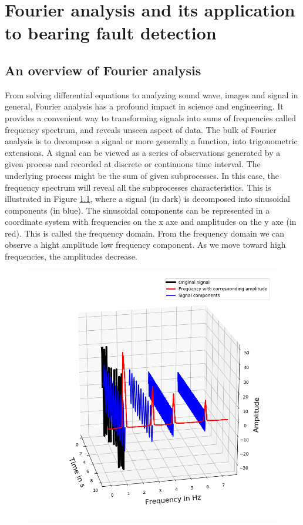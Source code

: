 \documentclass[../Main/thesis.tex]{subfiles}
\begin{document}
\chapter[Fourier analysis and its application to bearing fault detection]{Fourier analysis and its application to bearing fault detection}
\label{sec:chapter2}

\section{An overview of Fourier analysis}
From solving differential equations to analyzing sound wave, images and signal in general, Fourier analysis has a profound impact in science and engineering. It provides a convenient way to transforming signals into sums of frequencies called frequency spectrum, and reveals unseen aspect of data. The bulk of Fourier analysis is to decompose a signal or more generally a function, into trigonometric extensions. 
\justify
 A signal can be viewed as a series of observations generated by a given process and recorded at discrete or continuous time interval. The underlying process might be the sum of given subprocesses. In this case, the frequency spectrum will reveal all the subprocesses characteristics.
This is illustrated in Figure \ref{fig:fft_domain}, where a signal (in dark) is decomposed into sinusoidal components (in blue). The sinusoidal components can be represented in a coordinate system with frequencies on the x axe and amplitudes on the y axe (in red). This is called the frequency domain. From the frequency domain we can observe a hight amplitude low frequency component. As we move toward high frequencies, the amplitudes decrease.
\begin{figure}[H] %
   \centering
   \includegraphics[width=6in]{../fig/fft_domain} 
   \caption{}
   \label{fig:fft_domain}
\end{figure}
\end{document}
